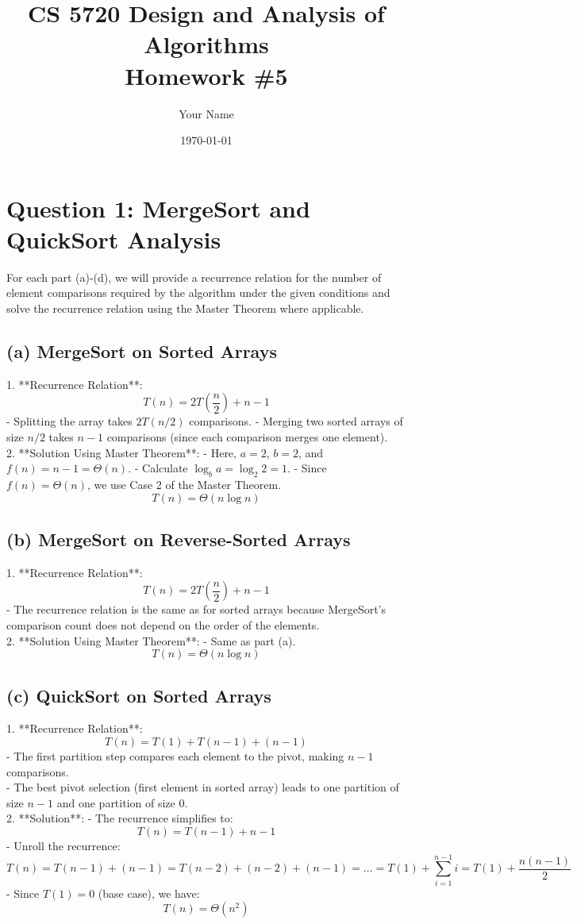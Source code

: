 \documentclass{article}
\title{CS 5720 Design and Analysis of Algorithms \\ Homework \#5}
\author{Your Name}
\date{\today}
\begin{document}
\maketitle

\section*{Question 1: MergeSort and QuickSort Analysis}
For each part (a)-(d), we will provide a recurrence relation for the number of element comparisons required by the algorithm under the given conditions and solve the recurrence relation using the Master Theorem where applicable.

\subsection*{(a) MergeSort on Sorted Arrays}
1. **Recurrence Relation**:
   \[
   T(n) = 2T\left(\frac{n}{2}\right) + n - 1
   \]
   - Splitting the array takes $2T(n/2)$ comparisons.
   - Merging two sorted arrays of size $n/2$ takes $n - 1$ comparisons (since each comparison merges one element).\\
2. **Solution Using Master Theorem**:
   - Here, $a = 2$, $b = 2$, and $f(n) = n - 1 = \Theta(n)$.
   - Calculate $\log_b{a} = \log_2{2} = 1$.
   - Since $f(n) = \Theta(n)$, we use Case 2 of the Master Theorem.
   \[
   T(n) = \Theta(n \log n)
   \]

\subsection*{(b) MergeSort on Reverse-Sorted Arrays}
1. **Recurrence Relation**:
   \[
   T(n) = 2T\left(\frac{n}{2}\right) + n - 1
   \]
   - The recurrence relation is the same as for sorted arrays because MergeSort's comparison count does not depend on the order of the elements.\\
2. **Solution Using Master Theorem**:
   - Same as part (a).
   \[
   T(n) = \Theta(n \log n)
   \]

\subsection*{(c) QuickSort on Sorted Arrays}
1. **Recurrence Relation**:
   \[
   T(n) = T(1) + T(n-1) + (n-1)
   \]
   - The first partition step compares each element to the pivot, making $n-1$ comparisons.\\
   - The best pivot selection (first element in sorted array) leads to one partition of size $n-1$ and one partition of size 0.\\
2. **Solution**:
   - The recurrence simplifies to:
   \[
   T(n) = T(n-1) + n - 1
   \]
   - Unroll the recurrence:
   \[
   T(n) = T(n-1) + (n-1) = T(n-2) + (n-2) + (n-1) = \ldots = T(1) + \sum_{i=1}^{n-1} i = T(1) + \frac{n(n-1)}{2}
   \]
   - Since $T(1) = 0$ (base case), we have:
   \[
   T(n) = \Theta(n^2)
   \]
\end{document}

